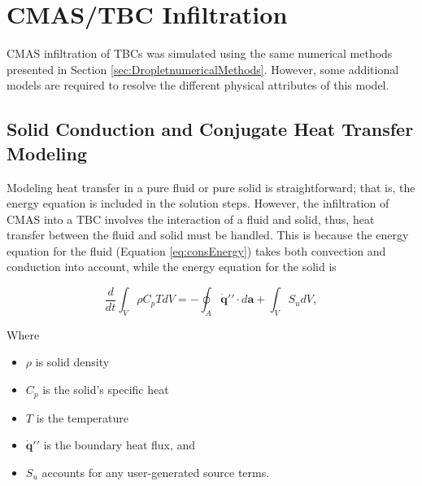 \documentclass{UCF_ETD}
\begin{document}



\section{CMAS/TBC Infiltration}
\label{sec:CMAS_methods}

CMAS infiltration of TBCs was simulated using the same numerical methods presented in Section \ref{sec:DropletnumericalMethods}. However, some additional models are required to resolve the different physical attributes of this model. 

\subsection{Solid Conduction and Conjugate Heat Transfer Modeling}

Modeling heat transfer in a pure fluid or pure solid is straightforward; that is, the energy equation is included in the solution steps. However, the infiltration of CMAS into a TBC involves the interaction of a fluid and solid, thus, heat transfer between the fluid and solid must be handled. This is because the energy equation for the fluid (Equation \ref{eq:consEnergy}) takes both convection and conduction into account, while the energy equation for the solid is 

\begin{equation}
    \frac{d}{d t} \int_V \rho C_p T d V=-\oint_A \dot{\mathbf{q}} \prime \prime \cdot d \mathbf{a}+\int_V S_u d V,
    \label{eq:solidEnergy}
\end{equation}

Where

\begin{itemize}
    \item $\rho$ is solid density
    \item $C_{p}$ is the solid's specific heat
    \item $T$ is the temperature
    \item $\dot{\mathbf{q}} \prime \prime$ is the boundary heat flux, and
    \item $S_{u}$ accounts for any user-generated source terms.
\end{itemize}
\end{document}
